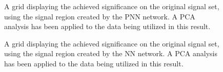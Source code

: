 \begin{figure}[H]
    \caption{A grid displaying the achieved significance on the original signal set, using the signal region 
    created by the \ac{PNN} network. A \ac{PCA} analysis has been applied to the data being utilized in this result.}
    \label{fig:PNNPCAGridSig}
\end{figure}

\begin{figure}[H]
    \caption{A grid displaying the achieved significance on the original signal set, using the signal region 
    created by the \ac{NN} network. A \ac{PCA} analysis has been applied to the data being utilized in this result.}
    \label{fig:NNPCAComp}
\end{figure}
\newpage